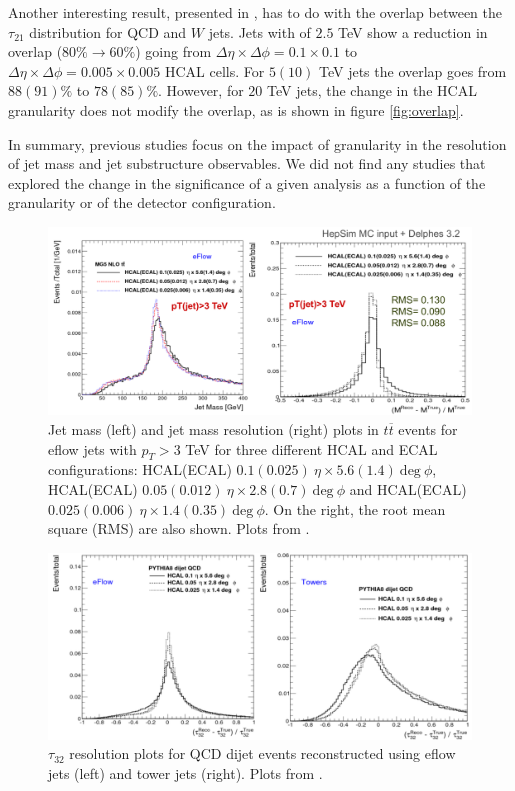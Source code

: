 Another interesting result, presented in \cite{BOOST2017}, has to do with the overlap between the $\tau_{21}$ distribution for QCD and $W$ jets. Jets with of $2.5$ TeV show a reduction in overlap ($80\%\rightarrow 60\%$) going from $\Delta\eta\times\Delta\phi=0.1\times 0.1$ to $\Delta\eta\times\Delta\phi=0.005\times 0.005$ HCAL cells. For $5(10)$ TeV jets the overlap goes from $88(91)\%$ to $78(85)\%$. However, for $20$ TeV jets, the change in the HCAL granularity does not modify the overlap, as is shown in figure \ref{fig:overlap}. 

In summary, previous studies focus on the impact of granularity in the resolution of jet mass and jet substructure observables. We did not find any studies that explored the change in the significance of a given analysis as a function of the granularity or of the detector configuration.

\begin{figure}
	\centering
	\includegraphics[width=\textwidth]{./Figures/hcal_gran_jet_mass.png}
	\caption{Jet mass (left) and jet mass resolution (right) plots in $t\overline{t}$ events for eflow jets with $p_T>3$ TeV for three different HCAL and ECAL configurations: HCAL(ECAL) $0.1(0.025)~\eta \times 5.6(1.4)~\text{deg}~\phi$, HCAL(ECAL) $0.05(0.012)~\eta \times 2.8(0.7)~\text{deg}~\phi$ and HCAL(ECAL) $0.025(0.006)~\eta \times 1.4(0.35)~\text{deg}~\phi$. On the right, the root mean square (RMS) are also shown. Plots from \cite{BOOST2017}.}
	\label{fig:hcal_gran_jet_mass}
\end{figure}

\begin{figure}
	\centering
	\includegraphics[width=\textwidth]{./Figures/hcal_gran_tau32.png}
	\caption{$\tau_{32}$ resolution plots for QCD dijet events reconstructed using eflow jets (left) and tower jets (right). Plots from \cite{FCCweek2015}.}
	\label{fig:hcal_gran_tau32}
\end{figure}

